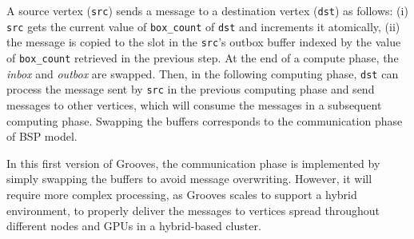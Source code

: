A source vertex (\texttt{src}) sends a message to a destination vertex (\texttt{dst}) as follows: (i) \texttt{src} gets the current value of \texttt{box\_count} of \texttt{dst} and increments it atomically, (ii) the message is copied to the slot in the \texttt{src}'s outbox buffer indexed by the value of \texttt{box\_count} retrieved in the previous step. At the end of a compute phase, the \emph{inbox} and \emph{outbox} are swapped. Then, in the following computing phase, \texttt{dst} can process the message sent by \texttt{src} in the previous computing phase and send messages to other vertices, which will consume the messages in a subsequent computing phase. Swapping the buffers corresponds to the communication phase of BSP model. 

In this first version of {\sc Grooves}, the communication phase is implemented by simply swapping the buffers to avoid message overwriting. However, it will require more complex processing, as {\sc Grooves} scales to support a hybrid environment, to properly deliver the messages to vertices spread throughout different nodes and GPUs in a hybrid-based cluster. 
